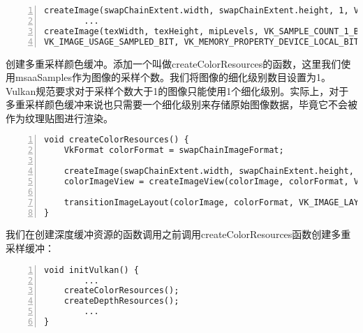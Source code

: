 \documentclass{ctexart}
\begin{document}
\begin{lstlisting}[language={[ANSI]C},keywordstyle=\color{blue!70},commentstyle=\color{red!50!green!50!blue!50},frame=shadowbox, rulesepcolor=\color{red!20!green!20!blue!20},basicstyle=\small,numbers=left, numberstyle=\tiny,breaklines=true]
createImage(swapChainExtent.width, swapChainExtent.height, 1, VK_SAMPLE_COUNT_1_BIT, depthFormat, VK_IMAGE_TILING_OPTIMAL, VK_IMAGE_USAGE_DEPTH_STENCIL_ATTACHMENT_BIT, VK_MEMORY_PROPERTY_DEVICE_LOCAL_BIT, depthImage, depthImageMemory);
		...
createImage(texWidth, texHeight, mipLevels, VK_SAMPLE_COUNT_1_BIT, VK_FORMAT_R8G8B8A8_UNORM, VK_IMAGE_TILING_OPTIMAL, VK_IMAGE_USAGE_TRANSFER_SRC_BIT | VK_IMAGE_USAGE_TRANSFER_DST_BIT |
VK_IMAGE_USAGE_SAMPLED_BIT, VK_MEMORY_PROPERTY_DEVICE_LOCAL_BIT, textureImage, textureImageMemory);
\end{lstlisting}

创建多重采样颜色缓冲。添加一个叫做createColorResources的函数，这里我们使用msaaSamples作为图像的采样个数。我们将图像的细化级别数目设置为1。Vulkan规范要求对于采样个数大于1的图像只能使用1个细化级别。实际上，对于多重采样颜色缓冲来说也只需要一个细化级别来存储原始图像数据，毕竟它不会被作为纹理贴图进行渲染。

\begin{lstlisting}[language={[ANSI]C},keywordstyle=\color{blue!70},commentstyle=\color{red!50!green!50!blue!50},frame=shadowbox, rulesepcolor=\color{red!20!green!20!blue!20},basicstyle=\small,numbers=left, numberstyle=\tiny,breaklines=true]
void createColorResources() {
	VkFormat colorFormat = swapChainImageFormat;

	createImage(swapChainExtent.width, swapChainExtent.height, 1, msaaSamples, colorFormat, VK_IMAGE_TILING_OPTIMAL, VK_IMAGE_USAGE_TRANSIENT_ATTACHMENT_BIT | VK_IMAGE_USAGE_COLOR_ATTACHMENT_BIT, VK_MEMORY_PROPERTY_DEVICE_LOCAL_BIT, colorImage, colorImageMemory);
	colorImageView = createImageView(colorImage, colorFormat, VK_IMAGE_ASPECT_COLOR_BIT, 1);

	transitionImageLayout(colorImage, colorFormat, VK_IMAGE_LAYOUT_UNDEFINED,VK_IMAGE_LAYOUT_COLOR_ATTACHMENT_OPTIMAL, 1);
}
\end{lstlisting}

我们在创建深度缓冲资源的函数调用之前调用createColorResources函数创建多重采样缓冲：

\begin{lstlisting}[language={[ANSI]C},keywordstyle=\color{blue!70},commentstyle=\color{red!50!green!50!blue!50},frame=shadowbox, rulesepcolor=\color{red!20!green!20!blue!20},basicstyle=\small,numbers=left, numberstyle=\tiny,breaklines=true]
void initVulkan() {
		...
	createColorResources();
	createDepthResources();
		...
}
\end{lstlisting}
\end{document}
